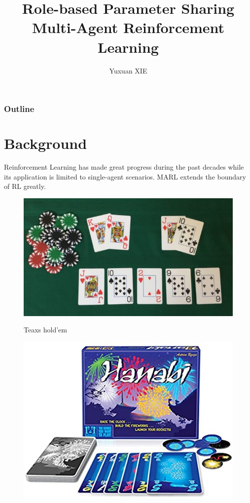 \documentclass[notheorems, aspectratio=54]{beamer}
\title[Role-based PS MARL]{Role-based Parameter Sharing Multi-Agent Reinforcement Learning}
\author{Yuxuan XIE}
\institute[HIT]{yuxuan.xie@hotmail.com}
\begin{document}
\begin{frame}
  \titlepage
\end{frame}

\begin{frame}
  \frametitle{Outline}
  \tableofcontents
\end{frame}

\section{Background}
\begin{frame}
    Reinforcement Learning has made great progress during the past decades while its application is limited to single-agent scenarios. MARL extends the boundary of RL greatly.
  \begin{figure}[h]
  \begin{minipage}{0.3\textwidth}
    \includegraphics[width=\textwidth]{holdem-showdown-1280x720-600x338.jpg}
    \begin{center}
    Teaxs hold'em
    \end{center}
  \end{minipage}%
  \hspace{0.02\linewidth}
  \begin{minipage}{0.3\textwidth}
    \includegraphics[width=\textwidth]{hanabi.jpg}

\end{minipage}
\end{figure}
\end{frame}
\end{document}
